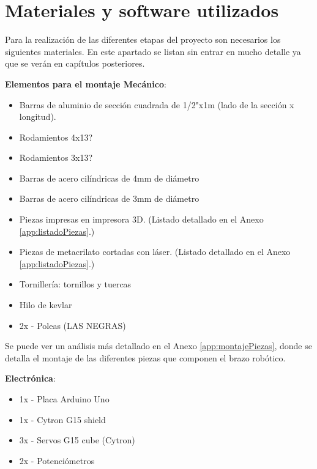 \section{Materiales y software utilizados}\label{sec:Introduccion:materiales_software} 

Para la realización de las diferentes etapas del proyecto son necesarios los siguientes materiales. En este apartado se listan sin entrar en mucho detalle ya que se verán en capítulos posteriores.

\textbf{Elementos para el montaje Mecánico}:
    \begin{itemize}
        \item Barras de aluminio de sección cuadrada de 1/2"x1m (lado de la sección x longitud).
        \item Rodamientos 4x13?
        \item Rodamientos 3x13?
        \item Barras de acero cilíndricas de 4mm de diámetro
        \item Barras de acero cilíndricas de 3mm de diámetro
        \item Piezas impresas en impresora 3D. (Listado detallado en el Anexo \ref{app:listadoPiezas}.)
        \item Piezas de metacrilato cortadas con láser. (Listado detallado en el Anexo \ref{app:listadoPiezas}.)
        \item Tornillería: tornillos y tuercas
        \item Hilo de kevlar
        \item 2x - Poleas (LAS NEGRAS)
    \end{itemize}
    
    Se puede ver un análisis más detallado en el Anexo \ref{app:montajePiezas}, donde se detalla el montaje de las diferentes piezas que componen el brazo robótico.

\textbf{Electrónica}:
    \begin{itemize}
        \item 1x - Placa Arduino Uno
        \item 1x - Cytron G15 shield
        \item 3x - Servos G15 cube (Cytron)
        \item 2x - Potenciómetros
    \end{itemize}


